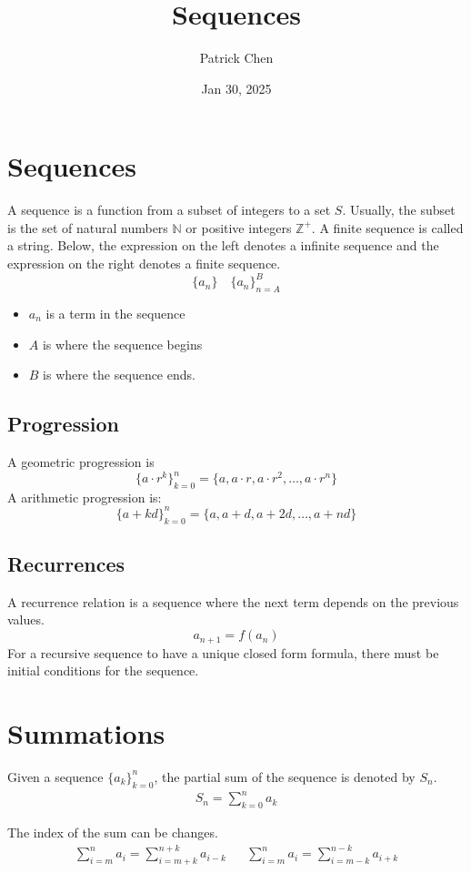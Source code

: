 \documentclass{article}
\title{Sequences}
\author{Patrick Chen}
\date{Jan 30, 2025}
\theoremstyle{mytheoremstyle}
\theoremstyle{mytheoremstyle}
\theoremstyle{myproblemstyle}
\begin{document}
    \maketitle
    \section*{Sequences}
    A sequence is a function from a subset of integers to a set $S$. Usually,
    the subset is the set of natural numbers $\mathbb{N}$ or positive integers
    $\mathbb{Z}^+$. A finite sequence is called a string. Below, the expression
    on the left denotes a infinite sequence and the expression on the right
    denotes a finite sequence.
    \[
        \{a_n\} \quad \{a_n\}_{n=A}^{B}
    \]
    \begin{itemize}
        \item $a_n$ is a term in the sequence
        \item $A$ is where the sequence begins
        \item $B$ is where the sequence ends.
    \end{itemize}
    \subsection*{Progression}
    A geometric progression is
    \[
        \{a\cdot r^k\}_{k=0}^n = \{a, a\cdot r, a\cdot r^2, \dots, a\cdot r^n\}
    \]
    A arithmetic progression is:
    \[
        \{a+kd\}_{k=0}^n = \{a, a+d, a+2d, \dots, a+nd\}
    \]
    \subsection*{Recurrences}
    A recurrence relation is a sequence where the next term depends on the
    previous values.
    \[
        a_{n+1} = f(a_n)
    \]
    For a recursive sequence to have a unique closed form formula, there must be
    initial conditions for the sequence.

    \section*{Summations}
    Given a sequence $\{a_k\}_{k=0}^n$, the partial sum of the sequence is
    denoted by $S_n$.
    \begin{align*}
        S_n = \sum_{k=0}^n a_k
    \end{align*}

    The index of the sum can be changes.
    \begin{align*}
        \sum_{i=m}^{n} a_i = \sum_{i=m+k}^{n+k} a_{i-k} &&
        \sum_{i=m}^{n} a_i = \sum_{i=m-k}^{n-k} a_{i+k}
    \end{align*}
\end{document}
